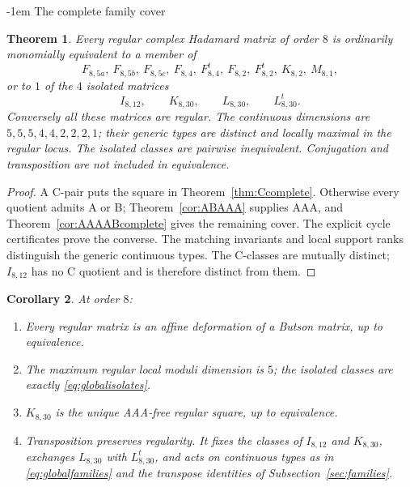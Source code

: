 \documentclass[11pt,a4paper]{article}
\makeatletter
\newtheorem{theorem}{Theorem}[section]
\newtheorem{corollary}[theorem]{Corollary}
\theoremstyle{plain}
\theoremstyle{definition}
\numberwithin{equation}{section}
\renewcommand\subsection{\@startsection{subsection}{2}{\z@}  {\medskipamount}  {-1em}  {\normalfont\normalsize\bfseries}}
\makeatother
\begin{document}
\subsection{The complete family cover}\label{sec:globalN8}
\begin{theorem}\label{thm:globalN8}
Every regular complex Hadamard matrix of order $8$ is ordinarily monomially equivalent to a member of
\begin{equation}\label{eq:globalfamilies}
 F_{8,5a},\ F_{8,5b},\ F_{8,5c},\ F_{8,4},\ F_{8,4}^{t},\
 F_{8,2},\ F_{8,2}^{t},\ K_{8,2},\ M_{8,1},
\end{equation}
or to $1$ of the $4$ isolated matrices
\begin{equation}\label{eq:globalisolates}
 I_{8,12},\qquad K_{8,30},\qquad L_{8,30},\qquad L_{8,30}^{t}.
\end{equation}
Conversely all these matrices are regular. The continuous dimensions are $5,5,5,4,4,2,2,2,1$; their generic types are distinct and locally maximal in the regular locus. The isolated classes are pairwise inequivalent. Conjugation and transposition are not included in equivalence.
\end{theorem}
\begin{proof}
A C-pair puts the square in Theorem~\ref{thm:Ccomplete}. Otherwise every quotient admits A or B; Theorem~\ref{cor:ABAAA} supplies AAA, and Theorem~\ref{cor:AAAABcomplete} gives the remaining cover. The explicit cycle certificates prove the converse. The matching invariants and local support ranks distinguish the generic continuous types. The C-classes are mutually distinct; $I_{8,12}$ has no C quotient and is therefore distinct from them.
\end{proof}
\begin{corollary}\label{thm:deformationN8}\label{cor:onlyKnoAAA}\label{cor:globaldimension}\label{cor:transposeN8}
At order $8$:
\begin{enumerate}[label=\rm(\roman*)]
\item Every regular matrix is an affine deformation of a Butson matrix, up to equivalence.
\item The maximum regular local moduli dimension is $5$; the isolated classes are exactly \eqref{eq:globalisolates}.
\item $K_{8,30}$ is the unique AAA-free regular square, up to equivalence.
\item Transposition preserves regularity. It fixes the classes of $I_{8,12}$ and $K_{8,30}$, exchanges $L_{8,30}$ with $L_{8,30}^{t}$, and acts on continuous types as in \eqref{eq:globalfamilies} and the transpose identities of Subsection~\ref{sec:families}.
\end{enumerate}
\end{corollary}
\end{document}

